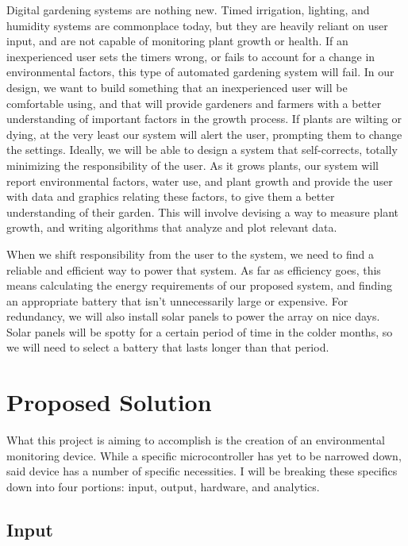 \documentclass[IEEEtran,letterpaper,10pt,titlepage,fleqn,draftclsnofoot,onecolumn]{article}
\begin{document}
Digital gardening systems are nothing new. Timed irrigation, lighting, and humidity systems are commonplace today, but they are heavily reliant on user input, and are not capable of monitoring plant growth or health. If an inexperienced user sets the timers wrong, or fails to account for a change in environmental factors, this type of automated gardening system will fail. In our design, we want to build something that an inexperienced user will be comfortable using, and that will provide gardeners and farmers with a better understanding of important factors in the growth process. If plants are wilting or dying, at the very least our system will alert the user, prompting them to change the settings. Ideally, we will be able to design a system that self-corrects, totally minimizing the responsibility of the user. As it grows plants, our system will report environmental factors, water use, and plant growth and provide the user with data and graphics relating these factors, to give them a better understanding of their garden. This will involve devising a way to measure plant growth, and writing algorithms that analyze and plot relevant data.

\vspace{5mm}

When we shift responsibility from the user to the system, we need to find a reliable and efficient way to power that system. As far as efficiency goes, this means calculating the energy requirements of our proposed system, and finding an appropriate battery that isn’t unnecessarily large or expensive. For redundancy, we will also install solar panels to power the array on nice days. Solar panels will be spotty for a certain period of time in the colder months, so we will need to select a battery that lasts longer than that period. 

\vspace{5mm}

\section{Proposed Solution}

What this project is aiming to accomplish is the creation of an environmental monitoring device. While a specific microcontroller has yet to be narrowed down, said device has a number of specific necessities. I will be breaking these specifics down into four portions: input, output, hardware, and analytics.

\subsection{Input}
\end{document}
